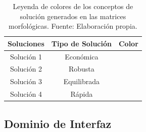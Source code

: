 \begin{table}[H]
	\centering
	\caption[Leyenda de colores de los conceptos de solución generados en las matrices
	morfológicas.]{Leyenda de colores de los conceptos de solución generados en las matrices
		morfológicas. Fuente: Elaboración propia.}
	\begin{tabular}{|c|c|c|}
		\hline
		\textbf{Soluciones} & \textbf{Tipo de Solución} & \textbf{Color} \bigstrut\\
		\hline
		Solución 1 & Económica & \cellcolor[rgb]{ 1,  0,  0} \bigstrut\\
		\hline
		Solución 2 & Robusta & \cellcolor[rgb]{ 0,  0,  1} \bigstrut\\
		\hline
		Solución 3 & Equilibrada & \cellcolor[rgb]{ .298,  .835,  .078} \bigstrut\\
		\hline
		Solución 4 & Rápida & \cellcolor[rgb]{ 1,  .502,  0} \bigstrut\\
		\hline
	\end{tabular}%
	\label{tab:leyenda_colores_soluciones}%
\end{table}%


\subsection{Dominio de Interfaz}

